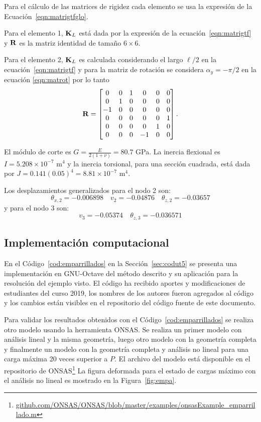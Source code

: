 Para el cálculo de las matrices de rigidez cada elemento se usa la expresión de la Ecuación~\eqref{eqn:matrigtfglo}.

Para el elemento 1, ${\bf K}_L$ está dada por la expresión de la ecuación~\eqref{eqn:matrigtf} y ${\bf R}$ es la matriz identidad de tamaño $6\times6$.

Para el elemento 2, ${\bf K}_L$ es calculada considerando el largo $\ell/2$ en la ecuación~\eqref{eqn:matrigtf} y para la matriz de rotación se considera $\alpha_y=-\pi/2$ en la ecuación \eqref{eqn:matrot} por lo tanto
\begin{equation}
\bfR = 
\left[
\begin{matrix}
0 & 0  & 1 & 0 & 0 & 0\\
0 & 1 & 0 &  0 & 0 & 0\\
-1 & 0  & 0 & 0 & 0 & 0\\
%
0 & 0 & 0 & 0 & 0  & 1 \\
0 & 0 & 0 & 0 & 1 & 0 \\
0 & 0 & 0 & -1 & 0  & 0
\end{matrix}
\right].
%
\end{equation}


El módulo de corte es $G=\frac{E}{2(1+\nu)} = 80.7 $ GPa. La inercia flexional es $I= 5.208 \times 10^{-7}$ m$^4$ y la inercia torsional, para una sección cuadrada, está dada por $J= 0.141 (0.05)^4 = 8.81 \times 10^{-7}$ m$^4$.

Los desplazamientos generalizados para el nodo 2 son:
%
$$
\theta_{x,2} = -0.006898
\quad 
v_2 = -0.04876
\quad
\theta_{z,2} = -0.03657
$$
%
y para el nodo 3 son:
$$
v_3 = -0.05374
\quad
\theta_{z,3} = 
-0.036571
$$


\subsection{Implementación computacional}

En el Código~\ref{cod:emparrillados} en la Sección~\ref{sec:codut5} se presenta una implementación en GNU-Octave del método descrito y su aplicación para la resolución del ejemplo visto. %
%
El código ha recibido aportes y modificaciones de estudiantes del curso 2019, los nombres de los autores fueron agregados al código y los cambios están visibles en el repositorio del código fuente de este documento.

Para validar los resultados obtenidos con el Código~\ref{cod:emparrillados} se realiza otro modelo usando la herramienta ONSAS. Se realiza un primer modelo con análisis lineal y la misma geometría, luego otro modelo con la geometría completa y finalmente un modelo con la geometría completa y análisis no lineal para una carga máxima 20 veces superior a $P$. El archivo del modelo está disponible en el repositorio de ONSAS\footnote{\href{https://github.com/ONSAS/ONSAS/blob/master/examples/onsasExample_emparrillado.m}{github.com/ONSAS/ONSAS/blob/master/examples/onsasExample\_emparrillado.m}} La figura deformada para el estado de cargas máximo con el análisis no lineal es mostrado en la Figura~\ref{fig:empa}.

